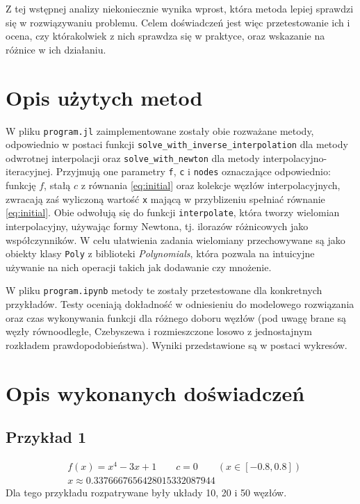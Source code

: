 \documentclass{article}
\begin{document}
Z tej wstępnej analizy niekoniecznie wynika wprost, która metoda lepiej sprawdzi się w rozwiązywaniu problemu. Celem doświadczeń jest więc przetestowanie ich i ocena, czy którakolwiek z nich sprawdza się w praktyce, oraz wskazanie na różnice w ich działaniu.

\newpage

\section{Opis użytych metod}

W pliku \texttt{program.jl} zaimplementowane zostały obie rozważane metody, odpowiednio w postaci funkcji \texttt{solve\_with\_inverse\_interpolation} dla metody odwrotnej interpolacji oraz \texttt{solve\_with\_newton} dla metody interpolacyjno-iteracyjnej. Przyjmują one parametry \texttt{f}, \texttt{c} i \texttt{nodes} oznaczające odpowiednio: funkcję $f$, stałą $c$ z równania \eqref{eq:initial} oraz kolekcje węzłów interpolacyjnych, zwracają zaś wyliczoną wartość \texttt{x} mającą w przyblizeniu spełniać równanie \eqref{eq:initial}. Obie odwołują się do funkcji \texttt{interpolate}, która tworzy wielomian interpolacyjny, używając formy Newtona, tj. ilorazów różnicowych jako współczynników. W celu ułatwienia zadania wielomiany przechowywane są jako obiekty klasy \texttt{Poly} z biblioteki \textit{Polynomials}, która pozwala na intuicyjne używanie na nich operacji takich jak dodawanie czy mnożenie.

W pliku \texttt{program.ipynb} metody te zostały przetestowane dla konkretnych przykładów. Testy oceniają dokładność w odniesieniu do modelowego rozwiązania oraz czas wykonywania funkcji dla różnego doboru węzłów (pod uwagę brane są węzły równoodległe, Czebyszewa i rozmieszczone losowo z jednostajnym rozkładem prawdopodobieństwa). Wyniki przedstawione są w postaci wykresów.

\section{Opis wykonanych doświadczeń}

\subsection{Przykład 1}

\begin{align*}
    &f(x)=x^4 - 3x + 1 \qquad c=0 \qquad (x\in[-0.8, 0.8])\\
    &x\approx0.3376667656428015332087944
\end{align*}
Dla tego przykładu rozpatrywane były układy 10, 20 i 50 węzłów.
\end{document}
